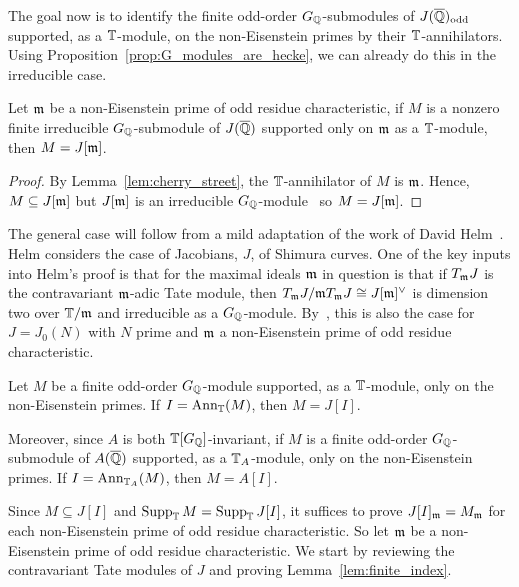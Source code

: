 \documentclass[thesis.tex]{subfiles}
\begin{document}
The goal now is to identify the finite odd-order $G_{\mathbb{Q}}$-submodules of
$J(\overline{\mathbb{Q}})_{\mathrm{odd}}$ supported, as a $\mathbb{T}$-module, on the non-Eisenstein primes by
their $\mathbb{T}$-annihilators. Using Proposition~\ref{prop:G_modules_are_hecke}, we
can already do this in the irreducible case.

\begin{proposition}
    Let $\mathfrak{m}$ be a non-Eisenstein prime of odd residue characteristic, if $M$ is
    a nonzero finite irreducible $G_{\mathbb{Q}}$-submodule of $J(\overline{\mathbb{Q}})$ supported
    only on $\mathfrak{m}$ as a $\mathbb{T}$-module, then $M=J[\mathfrak{m}]$.
\end{proposition}
\begin{proof}
    By Lemma~\ref{lem:cherry_street}, the $\mathbb{T}$-annihilator of $M$ is $\mathfrak{m}$.
    Hence, $M\subseteq J[\mathfrak{m}]$ but $J[\mathfrak{m}]$ is an irreducible
    $G_{\mathbb{Q}}$-module~\cite[Proposition 14.2]{mazur:eisenstein} so $M=J[\mathfrak{m}]$.
\end{proof}

The general case will follow from a mild adaptation of the work of David
Helm~\cite{helm:jacobian}. Helm considers the case of Jacobians, $J$, of
Shimura curves. One of the key inputs into Helm's proof is that for the maximal
ideals $\mathfrak{m}$ in question is that if $T_{\mathfrak{m}} J$ is the contravariant $\mathfrak{m}$-adic Tate
module, then $T_{\mathfrak{m}} J/\mathfrak{m} T_{\mathfrak{m}} J\cong J[\mathfrak{m}]^\vee$ is dimension two over $\mathbb{T}/\mathfrak{m}$
and irreducible as a $G_{\mathbb{Q}}$-module. By~\cite[Prop. 14.2]{mazur:eisenstein},
this is also the case for $J=J_0(N)$ with $N$ prime and $\mathfrak{m}$ a non-Eisenstein
prime of odd residue characteristic.

\begin{theorem}%
    \label{thm:non_eisenstein_kernel_hecke}
    Let $M$ be a finite odd-order $G_{\mathbb{Q}}$-module supported, as a $\mathbb{T}$-module,
    only on the non-Eisenstein primes. If $I=\operatorname{Ann}_{\mathbb{T}}(M)$, then $M=J[I]$.

    Moreover, since $A$ is both $\mathbb{T}[G_{\mathbb{Q}}]$-invariant, if $M$ is a finite
    odd-order $G_{\mathbb{Q}}$-submodule of $A(\overline{\mathbb{Q}})$ supported, as a $\mathbb{T}_A$-module,
    only on the non-Eisenstein primes. If $I=\operatorname{Ann}_{\mathbb{T}_A}(M)$, then $M=A[I]$.
\end{theorem}

Since $M\subseteq J[I]$ and $\operatorname{Supp}_{\mathbb{T}} M = \operatorname{Supp}_{\mathbb{T}} J[I]$, it suffices to
prove $J[I]_{\mathfrak{m}} = M_{\mathfrak{m}}$ for each non-Eisenstein prime of odd residue
characteristic. So let $\mathfrak{m}$ be a non-Eisenstein prime of odd residue
characteristic. We start by reviewing the contravariant Tate modules of $J$ and
proving Lemma~\ref{lem:finite_index}.
\end{document}
